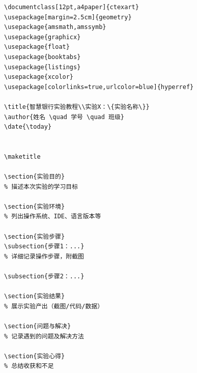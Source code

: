 \begin{lstlisting}[style=html]
\documentclass[12pt,a4paper]{ctexart}
\usepackage[margin=2.5cm]{geometry}
\usepackage{amsmath,amssymb}
\usepackage{graphicx}
\usepackage{float}
\usepackage{booktabs}
\usepackage{listings}
\usepackage{xcolor}
\usepackage[colorlinks=true,urlcolor=blue]{hyperref}

\title{智慧银行实验教程\\实验X：\{实验名称\}}
\author{姓名 \quad 学号 \quad 班级}
\date{\today}


\maketitle

\section{实验目的}
% 描述本次实验的学习目标

\section{实验环境}
% 列出操作系统、IDE、语言版本等

\section{实验步骤}
\subsection{步骤1：...}
% 详细记录操作步骤，附截图

\subsection{步骤2：...}

\section{实验结果}
% 展示实验产出（截图/代码/数据）

\section{问题与解决}
% 记录遇到的问题及解决方法

\section{实验心得}
% 总结收获和不足


\end{lstlisting}

